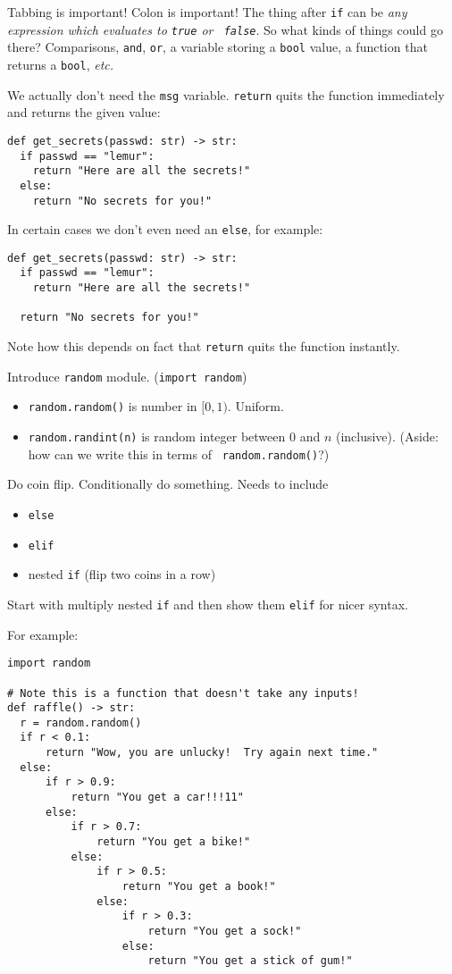 \documentclass{article}
\newcommand{\etc}{\emph{etc.}\xspace}
\begin{document}
Tabbing is important!  Colon is important!  The thing after {\tt if}
can be \emph{any expression which evaluates to {\tt true} or {\tt
    false}}.  So what kinds of things could go there?  Comparisons,
\verb|and|, \verb|or|, a variable storing a \verb|bool| value, a
function that returns a \verb|bool|, \etc

We actually don't need the \verb|msg| variable.  \verb|return| quits
the function immediately and returns the given value:

\begin{verbatim}
def get_secrets(passwd: str) -> str:
  if passwd == "lemur":
    return "Here are all the secrets!"
  else:
    return "No secrets for you!"
\end{verbatim}

In certain cases we don't even need an \verb|else|, for example:
\begin{verbatim}
def get_secrets(passwd: str) -> str:
  if passwd == "lemur":
    return "Here are all the secrets!"

  return "No secrets for you!"
\end{verbatim}
Note how this depends on fact that \verb|return| quits the function
instantly.

Introduce \verb|random| module. ({\tt import random})
\begin{itemize}
\item {\tt random.random()} is number in $[0,1)$. Uniform.
\item {\tt random.randint(n)} is random integer between $0$ and $n$
  (inclusive).  (Aside: how can we write this in terms of {\tt
    random.random()}?)
\end{itemize}
Do coin flip.  Conditionally do something.  Needs to include
\begin{itemize}
\item {\tt else}
\item {\tt elif}
\item nested {\tt if}  (flip two coins in a row)
\end{itemize}

Start with multiply nested {\tt if} and then show them {\tt elif} for
nicer syntax.

For example:
\begin{verbatim}
import random

# Note this is a function that doesn't take any inputs!
def raffle() -> str:
  r = random.random()
  if r < 0.1:
      return "Wow, you are unlucky!  Try again next time."
  else:
      if r > 0.9:
          return "You get a car!!!11"
      else:
          if r > 0.7:
              return "You get a bike!"
          else:
              if r > 0.5:
                  return "You get a book!"
              else:
                  if r > 0.3:
                      return "You get a sock!"
                  else:
                      return "You get a stick of gum!"
\end{verbatim}
\end{document}

